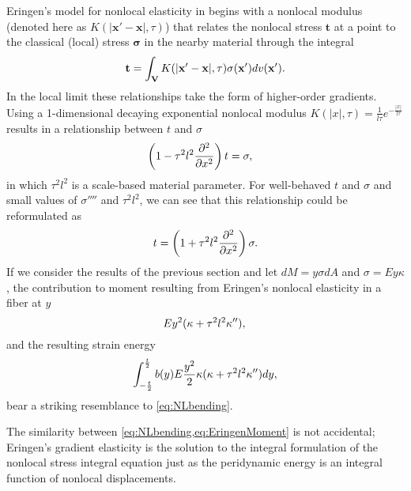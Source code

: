 \documentclass[11pt]{amsart}
\begin{document}
Eringen's model for nonlocal elasticity in \cite{eringen1983differential} begins with a nonlocal modulus (denoted here as \(K(|\mathbf{x}'-\mathbf{x}|,\tau)\)) that relates the nonlocal stress \(\mathbf{t}\) at a point to the classical (local) stress \(\boldsymbol{\sigma}\) in the nearby material through the integral
\begin{equation}
\mathbf{t} = \int_\mathbf{V} K(|\mathbf{x}'-\mathbf{x}|,\tau)\sigma(\mathbf{x}')dv(\mathbf{x}').\notag
\end{equation}
In the local limit these relationships take the form of higher-order gradients.
Using a 1-dimensional decaying exponential nonlocal modulus \(K(|x|,\tau)=\frac{1}{l\tau}e^{-\frac{|x|}{l\tau}}\)results in a relationship between \(t\) and \(\sigma\) 
\begin{align}
\left(1-\tau^2l^2\frac{\partial^2}{\partial x^2}\right)t&=\sigma,\notag
\end{align}
in which \(\tau^2l^2\) is a scale-based material parameter.
For well-behaved \(t\) and \(\sigma\) and small values of \(\sigma''''\) and \(\tau^2l^2\), we can see that this relationship could be reformulated as
\begin{equation}
\label{eq:NLstress}
t=\left(1+\tau^2l^2\frac{\partial^2}{\partial x^2}\right)\sigma.\notag
\end{equation}
If we consider the results of the previous section and let \(dM = y\sigma dA\) and \(\sigma = Ey\kappa\), the contribution to moment resulting from Eringen's nonlocal elasticity in a fiber at \(y\)
\begin{equation}
\label{eq:EringenMoment}
E y^2 (\kappa+\tau^2l^2\kappa''), \\
\end{equation}
and the resulting strain energy
\begin{equation}
\label{eq:EringenEnergy}
\int_{-\frac{t}{2}}^{\frac{t}{2}} b(y) E \frac{y^2}{2} \kappa (\kappa+\tau^2l^2\kappa'')  dy,\notag
\end{equation}
bear a striking resemblance to \cref{eq:NLbending}.

The similarity between \cref{eq:NLbending,eq:EringenMoment} is not accidental; Eringen's gradient elasticity is the solution to the integral formulation of the nonlocal stress integral equation just as the peridynamic energy is an integral function of nonlocal displacements.
\end{document}
